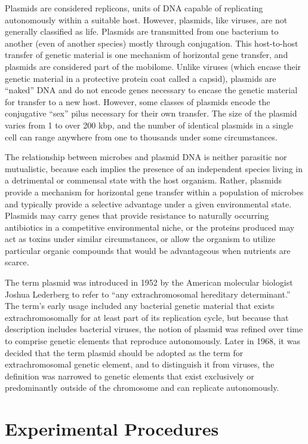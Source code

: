 \documentclass[]{book}
\begin{document}
Plasmids are considered replicons, units of DNA capable of replicating
autonomously within a suitable host. However, plasmids, like viruses,
are not generally classified as life. Plasmids are transmitted from one
bacterium to another (even of another species) mostly through
conjugation. This host-to-host transfer of genetic material is one
mechanism of horizontal gene transfer, and plasmids are considered part
of the mobilome. Unlike viruses (which encase their genetic material in
a protective protein coat called a capsid), plasmids are ``naked'' DNA
and do not encode genes necessary to encase the genetic material for
transfer to a new host. However, some classes of plasmids encode the
conjugative ``sex'' pilus necessary for their own transfer. The size of
the plasmid varies from 1 to over 200 kbp, and the number of identical
plasmids in a single cell can range anywhere from one to thousands under
some circumstances.

The relationship between microbes and plasmid DNA is neither parasitic
nor mutualistic, because each implies the presence of an independent
species living in a detrimental or commensal state with the host
organism. Rather, plasmids provide a mechanism for horizontal gene
transfer within a population of microbes and typically provide a
selective advantage under a given environmental state. Plasmids may
carry genes that provide resistance to naturally occurring antibiotics
in a competitive environmental niche, or the proteins produced may act
as toxins under similar circumstances, or allow the organism to utilize
particular organic compounds that would be advantageous when nutrients
are scarce.

The term plasmid was introduced in 1952 by the American molecular
biologist Joshua Lederberg to refer to ``any extrachromosomal hereditary
determinant.'' The term's early usage included any bacterial genetic
material that exists extrachromosomally for at least part of its
replication cycle, but because that description includes bacterial
viruses, the notion of plasmid was refined over time to comprise genetic
elements that reproduce autonomously. Later in 1968, it was decided that
the term plasmid should be adopted as the term for extrachromosomal
genetic element, and to distinguish it from viruses, the definition was
narrowed to genetic elements that exist exclusively or predominantly
outside of the chromosome and can replicate autonomously.

\section{Experimental Procedures}\label{experimental-procedures-16}
\end{document}
